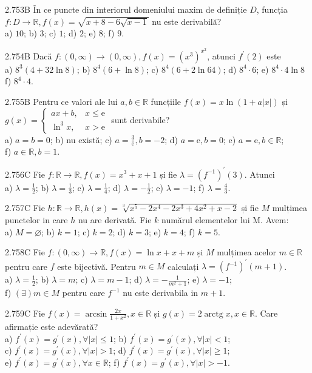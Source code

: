 \documentclass[11pt]{article}
\begin{document}
2.753B În ce puncte din interiorul domeniului maxim de definiție $D$, funcția $f: D \rightarrow \mathbb{R}, f(x)=\sqrt{x+8-6 \sqrt{x-1}}$ nu este derivabilă?\\ a) $10$; b) $3$; c) $1$; d) $2$; e) $8$; f) $9$.

2.754B Dacă $f:(0, \infty) \rightarrow(0, \infty), f(x)=\left(x^{3}\right)^{x^{2}}$, atunci $f^{\prime}(2)$ este\\ a) $8^{3}(4+32 \ln 8)$; b) $8^{4}(6+\ln 8)$; c) $8^{4}(6+2 \ln 64)$; d) $8^{4} \cdot 6$; e) $8^{4} \cdot 4 \ln 8$ f) $8^{4} \cdot 4$.

2.755B Pentru ce valori ale lui $a, b \in \mathbb{R}$ funcțiile $f(x)=x \ln (1+a|x|)$ și $g(x)=\left\{\begin{array}{ll}a x+b, & x \leq \mathrm{e} \\ \ln ^{3} x, & x>\mathrm{e}\end{array}\right.$ sunt derivabile?\\ a) $a=b=0$; b) nu există; c) $a=\frac{3}{\mathrm{e}}, b=-2$; d) $a=\mathrm{e}, b=0$; e) $a=\mathrm{e}, b \in \mathbb{R}$;\\ f) $a \in \mathbb{R}, b=1$.

2.756C Fie $f: \mathbb{R} \rightarrow \mathbb{R}, f(x)=x^{3}+x+1$ și fie $\lambda=\left(f^{-1}\right)^{\prime}(3)$. Atunci\\ a) $\lambda=\frac{1}{2}$; b) $\lambda=\frac{1}{3}$; c) $\lambda=\frac{1}{4}$; d) $\lambda=-\frac{1}{2}$; e) $\lambda=-1$; f) $\lambda=\frac{4}{3}$.

2.757C Fie $h: \mathbb{R} \rightarrow \mathbb{R}, h(x)=\sqrt[3]{x^{5}-2 x^{4}-2 x^{3}+4 x^{2}+x-2}$ și fie $M$ mulțimea punctelor in care $h$ nu are derivată. Fie $k$ numărul elementelor lui M. Avem:\\ a) $M=\varnothing$; b) $k=1$; c) $k=2$; d) $k=3$; e) $k=4$; f) $k=5$.

2.758C Fie $f:(0, \infty) \rightarrow \mathbb{R}, f(x)=\ln x+x+m$ și $M$ mulțimea acelor $m \in \mathbb{R}$ pentru care $f$ este bijectivă. Pentru $m \in M$ calculați $\lambda=\left(f^{-1}\right)^{\prime}(m+1)$.\\ a) $\lambda=\frac{1}{2}$; b) $\lambda=m$; c) $\lambda=m-1$; d) $\lambda=-\frac{1}{m^{2}+1}$; e) $\lambda=-1$;\\ f) $(\exists) m \in M$ pentru care $f^{-1}$ nu este derivabila in $m+1$.

2.759C Fie $f(x)=\arcsin \frac{2 x}{1+x^{2}}, x \in \mathbb{R}$ și $g(x)=2 \operatorname{arctg} x, x \in \mathbb{R}$. Care afirmație este adevărată?\\ a) $f^{\prime}(x)=g^{\prime}(x), \forall|x| \leq 1$; b) $f^{\prime}(x)=g^{\prime}(x), \forall|x|<1$;\\ c) $f^{\prime}(x)=g^{\prime}(x), \forall|x|>1$; d) $f^{\prime}(x)=g^{\prime}(x), \forall|x| \geq 1$;\\ e) $f^{\prime}(x)=g^{\prime}(x), \forall x \in \mathbb{R}$; f) $f^{\prime}(x)=g^{\prime}(x), \forall|x|>-1$.
\end{document}
